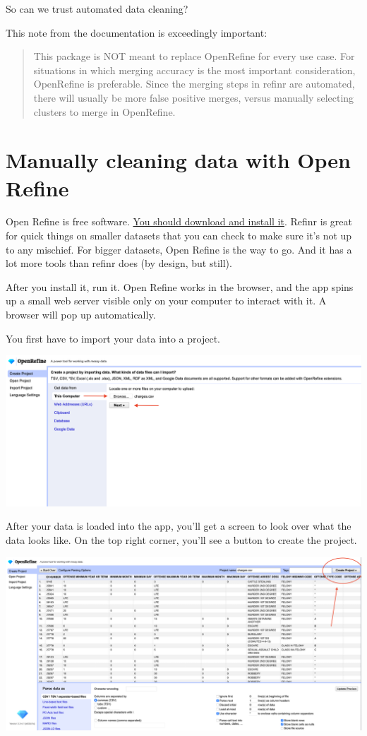 \documentclass[]{book}
\begin{document}
So can we trust automated data cleaning?

This note from the documentation is exceedingly important:

\begin{quote}
This package is NOT meant to replace OpenRefine for every use case. For situations in which merging accuracy is the most important consideration, OpenRefine is preferable. Since the merging steps in refinr are automated, there will usually be more false positive merges, versus manually selecting clusters to merge in OpenRefine.
\end{quote}

\hypertarget{manually-cleaning-data-with-open-refine}{%
\section{Manually cleaning data with Open Refine}\label{manually-cleaning-data-with-open-refine}}

Open Refine is free software. \href{https://openrefine.org/}{You should download and install it}. Refinr is great for quick things on smaller datasets that you can check to make sure it's not up to any mischief. For bigger datasets, Open Refine is the way to go. And it has a lot more tools than refinr does (by design, but still).

After you install it, run it. Open Refine works in the browser, and the app spins up a small web server visible only on your computer to interact with it. A browser will pop up automatically.

You first have to import your data into a project.

\includegraphics[width=35.44in]{images/open1}

After your data is loaded into the app, you'll get a screen to look over what the data looks like. On the top right corner, you'll see a button to create the project.

\includegraphics[width=46.64in]{images/open2}
\end{document}
